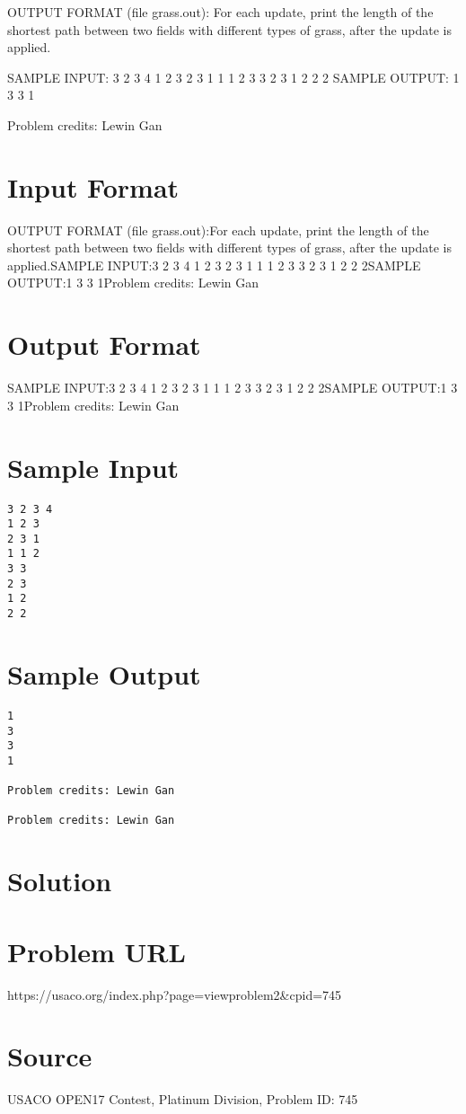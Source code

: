 \documentclass[12pt]{article}
\begin{document}
OUTPUT FORMAT (file grass.out):
For each update, print the length of the shortest path between two fields with
different types of grass, after the update is applied.

SAMPLE INPUT:
3 2 3 4
1 2 3
2 3 1
1 1 2
3 3
2 3
1 2
2 2
SAMPLE OUTPUT: 
1
3
3
1


Problem credits: Lewin Gan



\section*{Input Format}
OUTPUT FORMAT (file grass.out):For each update, print the length of the shortest path between two fields with
different types of grass, after the update is applied.SAMPLE INPUT:3 2 3 4
1 2 3
2 3 1
1 1 2
3 3
2 3
1 2
2 2SAMPLE OUTPUT:1
3
3
1Problem credits: Lewin Gan

\section*{Output Format}
SAMPLE INPUT:3 2 3 4
1 2 3
2 3 1
1 1 2
3 3
2 3
1 2
2 2SAMPLE OUTPUT:1
3
3
1Problem credits: Lewin Gan

\section*{Sample Input}
\begin{verbatim}
3 2 3 4
1 2 3
2 3 1
1 1 2
3 3
2 3
1 2
2 2
\end{verbatim}

\section*{Sample Output}
\begin{verbatim}
1
3
3
1

Problem credits: Lewin Gan

Problem credits: Lewin Gan
\end{verbatim}

\section*{Solution}


\section*{Problem URL}
https://usaco.org/index.php?page=viewproblem2&cpid=745

\section*{Source}
USACO OPEN17 Contest, Platinum Division, Problem ID: 745
\end{document}
